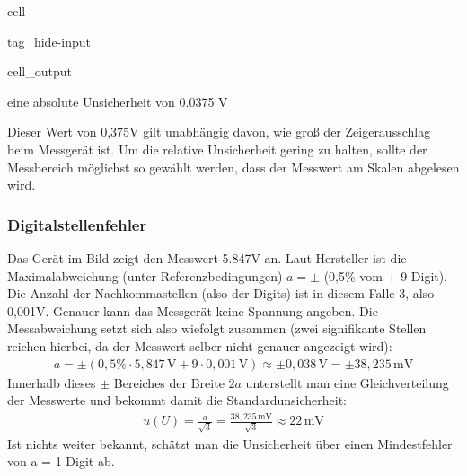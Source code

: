 \documentclass[letterpaper,10pt,english]{jupyterBook}
\begin{document}
\begin{sphinxuseclass}{cell}
\begin{sphinxuseclass}{tag_hide-input}\begin{sphinxVerbatimOutput}

\begin{sphinxuseclass}{cell_output}
\begin{sphinxVerbatim}[commandchars=\\\{\}]
eine absolute Unsicherheit von  0.0375 V
\end{sphinxVerbatim}

\end{sphinxuseclass}\end{sphinxVerbatimOutput}

\end{sphinxuseclass}
\end{sphinxuseclass}
\sphinxAtStartPar
Dieser Wert von 0,375V gilt unabhängig davon, wie groß der Zeigerausschlag beim Messgerät ist. Um die relative Unsicherheit gering zu halten, sollte der Messbereich möglichst so gewählt werden, dass der Messwert am Skalen abgelesen wird.


\subsubsection{Digitalstellenfehler}
\label{\detokenize{content/1_Messunsicherheiten:digitalstellenfehler}}
\sphinxAtStartPar
{}

\sphinxAtStartPar
Das Gerät im Bild zeigt den Messwert 5.847V an. Laut Hersteller ist die Maximalabweichung (unter Referenzbedingungen) \(a = \pm\) (0,5\% vom  + 9 Digit). Die Anzahl der Nachkommastellen (also der Digits) ist in diesem Falle 3, also 0,001V. Genauer kann das Messgerät keine Spannung angeben. Die Messabweichung setzt sich also wiefolgt zusammen (zwei signifikante Stellen reichen hierbei, da der Messwert selber nicht genauer angezeigt wird):
\begin{equation*}
\begin{split}a = \pm (0,5\% \cdot 5,847\,\mathrm{V} + 9 \cdot 0,001\,\mathrm V) \approx \pm 0,038\,\mathrm V = \pm 38,235\,\mathrm{mV}\end{split}
\end{equation*}
\sphinxAtStartPar
Innerhalb dieses \(\pm\) Bereiches der Breite \(2a\) unterstellt man eine Gleichverteilung der Messwerte und bekommt damit die Standardunsicherheit:
\begin{equation*}
\begin{split}u(U) = \frac{a}{\sqrt{3}} = \frac{38,235\,\mathrm{mV}}{\sqrt{3}} \approx 22\,\mathrm{mV}\end{split}
\end{equation*}
\sphinxAtStartPar
Ist nichts weiter bekannt, schätzt man die Unsicherheit über einen Mindestfehler von a = 1 Digit ab.
\end{document}
